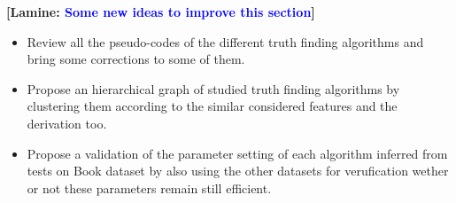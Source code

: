 \documentclass{vldb}
\newcommand{\lamine}[1]{\textbf{[Lamine: \textcolor{blue}{#1}]}}
\begin{document}
\lamine{Some new ideas to improve this section}
\begin{itemize}
 \item Review all the pseudo-codes of the different truth finding 
 algorithms and bring some corrections to some of them.
 \item Propose an hierarchical graph of studied truth finding algorithms
 by clustering them according to the similar considered features and the 
 derivation too.
 \item Propose a validation of the parameter setting of each algorithm
 inferred from tests on Book dataset by also using the other datasets
 for verufication wether or not these parameters remain still efficient.
\end{itemize}
\end{document}
